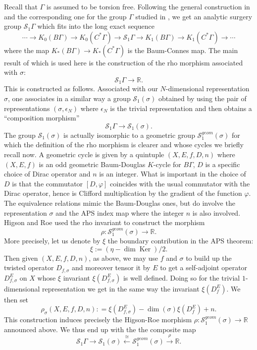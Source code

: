 \documentclass[12pt]{amsart}
\theoremstyle{plain}
\theoremstyle{definition}
\theoremstyle{remark}
\begin{document}
{Recall that $\Gamma$ is assumed to be torsion free. Following the general construction in \cite{HigsonRoe2} and the corresponding one for the group $\Gamma$ studied in \cite{HigsonRoeRho}, we get an analytic surgery group ${\mathcal S}_1\Gamma$ which fits into the long exact sequence
$$
\cdots \to K_0(B\Gamma) \rightarrow K_0(C^*\Gamma) \rightarrow {\mathcal S}_1\Gamma \rightarrow K_1(B\Gamma) \rightarrow K_1(C^*\Gamma)\to \cdots 
$$
where the map $K_*(B\Gamma) \rightarrow K_*(C^*\Gamma)$ is the Baum-Connes map. The main result of \cite{HigsonRoeRho} which is used here is the construction of the rho morphism associated with $\sigma$:
$$
{\mathcal S}_1\Gamma \longrightarrow {\mathbb{R}}.
$$
This is constructed as follows. Associated with our $N$-dimensional representation $\sigma$, one associates in a similar way a group ${\mathcal S}_1(\sigma)$ obtained by using the pair of representations $(\sigma, {\epsilon}_N)$ where ${\epsilon}_N$ is the trivial representation and then obtains a ``composition morphism'' 
$$
{\mathcal S}_1\Gamma \longrightarrow {\mathcal S}_1(\sigma).
$$
The group ${\mathcal S}_1(\sigma)$ is actually isomorphic to a geometric group ${\mathcal S}_1^{geom}(\sigma)$ for which the definition of the rho morphism is clearer and whose cycles we briefly recall now. A geometric cycle  is given by a quintuple $(X, E, f, D, n)$ where $(X,E,f)$ is an odd geometric Baum-Douglas $K$-cycle for $B\Gamma$, $D$ is a specific choice of Dirac operator and $n$ is an integer. What is important in the choice of $D$ is that the commutator $[D, \varphi]$ coincides with the usual commutator with the Dirac operator, hence is Clifford multiplication by the gradient of the function $\varphi$. The equivalence relations mimic the Baum-Douglas ones, but do involve the representation $\sigma$ and the APS index map where the integer $n$ is also involved. Higson and Roe used the rho invariant to construct the morphism 
$$
\rho: {\mathcal S}^{geom}_1(\sigma) \longrightarrow {\mathbb{R}}.
$$ 
More precisely, let us denote by $\xi $ the boundary contribution in the APS theorem:
$$
\xi := (\eta - \dim{\operatorname{Ker}} )/ 2.
$$
Then
given $ (X, E, f,  D, n)$, as above, we may use $f$ and $\sigma$ to build up the twisted operator $D_{f,\sigma}$ and moreover tensor it by $E$ to get a self-adjoint operator $D_{f,\sigma}^E$ on $X$ whose $\xi$ invariant $\xi (D_{f,\sigma}^E)$ is well defined. Doing so for the trivial $1$-dimensional representation we get in the same way the invariant $\xi (D_f^E)$. We then set 
$$
\rho_\sigma (X, E, f,  D, n) : = \xi  (D_{f,\sigma}^E) - \dim (\sigma) \xi (D_f^E) + n.
$$
This construction induces precisely the Higson-Roe morphism $\rho: {\mathcal S}^{geom}_1(\sigma) \rightarrow {\mathbb{R}}$ announced above.
We thus end up with the the composite map
$$
 {\mathcal S}_1 \Gamma \rightarrow {\mathcal S}_1(\sigma) \stackrel{\cong}{\leftarrow} {\mathcal S}^{geom}_1(\sigma) \stackrel{\rho}{\longrightarrow} {\mathbb{R}}.
$$

}
\end{document}
